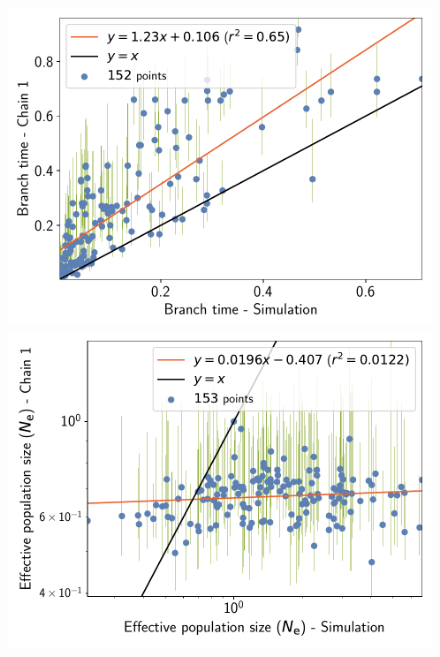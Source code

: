 \documentclass{article}
\begin{document}
\begin{figure}[H]
\begin{minipage}{0.32\linewidth}
			\includegraphics[width=\linewidth, page=1]{simulations/SimuFold_SiteMutSelBranchNe_BranchCorrelation_BranchTime}
		\end{minipage} \hfill
		\begin{minipage}{0.32\linewidth}
			\includegraphics[width=\linewidth, page=1]{simulations/SimuFold_SiteMutSelBranchNe_BranchCorrelation_LogPopulationSize}
		\end{minipage}
		\begin{minipage}{0.32\linewidth}

\end{minipage}
\end{figure}
\end{document}
